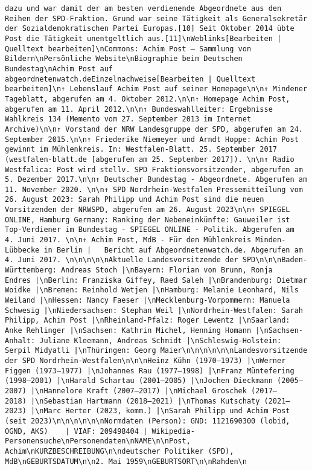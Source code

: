 \documentclass[
]{article}
\begin{document}
\begin{verbatim}
dazu und war damit der am besten verdienende Abgeordnete aus den Reihen der SPD-Fraktion. Grund war seine Tätigkeit als Generalsekretär der Sozialdemokratischen Partei Europas.[10] Seit Oktober 2014 übte Post die Tätigkeit unentgeltlich aus.[11]\nWeblinks[Bearbeiten | Quelltext bearbeiten]\nCommons: Achim Post – Sammlung von Bildern\nPersönliche Website\nBiographie beim Deutschen Bundestag\nAchim Post auf abgeordnetenwatch.deEinzelnachweise[Bearbeiten | Quelltext bearbeiten]\n↑ Lebenslauf Achim Post auf seiner Homepage\n\n↑ Mindener Tageblatt, abgerufen am 4. Oktober 2012.\n\n↑ Homepage Achim Post, abgerufen am 11. April 2012.\n\n↑ Bundeswahlleiter: Ergebnisse Wahlkreis 134 (Memento vom 27. September 2013 im Internet Archive)\n\n↑ Vorstand der NRW Landesgruppe der SPD, abgerufen am 24. September 2015.\n\n↑ Friederike Niemeyer und Arndt Hoppe: Achim Post gewinnt im Mühlenkreis. In: Westfalen-Blatt. 25. September 2017 (westfalen-blatt.de [abgerufen am 25. September 2017]). \n\n↑ Radio Westfalica: Post wird stellv. SPD Fraktionsvorsitzender, abgerufen am 5. Dezember 2017.\n\n↑ Deutscher Bundestag - Abgeordnete. Abgerufen am 11. November 2020. \n\n↑ SPD Nordrhein-Westfalen Pressemitteilung vom 26. August 2023: Sarah Philipp und Achim Post sind die neuen Vorsitzenden der NRWSPD, abgerufen am 26. August 2023\n\n↑ SPIEGEL ONLINE, Hamburg Germany: Ranking der Nebeneinkünfte: Gauweiler ist Top-Verdiener im Bundestag - SPIEGEL ONLINE - Politik. Abgerufen am 4. Juni 2017. \n\n↑ Achim Post, MdB - Für den Mühlenkreis Minden-Lübbecke in Berlin |   Bericht auf Abgeordnetenwatch.de. Abgerufen am 4. Juni 2017. \n\n\n\n\nAktuelle Landesvorsitzende der SPD\n\n\nBaden-Württemberg: Andreas Stoch |\nBayern: Florian von Brunn, Ronja Endres |\nBerlin: Franziska Giffey, Raed Saleh |\nBrandenburg: Dietmar Woidke |\nBremen: Reinhold Wetjen |\nHamburg: Melanie Leonhard, Nils Weiland |\nHessen: Nancy Faeser |\nMecklenburg-Vorpommern: Manuela Schwesig |\nNiedersachsen: Stephan Weil |\nNordrhein-Westfalen: Sarah Philipp, Achim Post |\nRheinland-Pfalz: Roger Lewentz |\nSaarland: Anke Rehlinger |\nSachsen: Kathrin Michel, Henning Homann |\nSachsen-Anhalt: Juliane Kleemann, Andreas Schmidt |\nSchleswig-Holstein: Serpil Midyatli |\nThüringen: Georg Maier\n\n\n\n\n\nLandesvorsitzende der SPD Nordrhein-Westfalen\n\n\nHeinz Kühn (1970–1973) |\nWerner Figgen (1973–1977) |\nJohannes Rau (1977–1998) |\nFranz Müntefering (1998–2001) |\nHarald Schartau (2001–2005) |\nJochen Dieckmann (2005–2007) |\nHannelore Kraft (2007–2017) |\nMichael Groschek (2017–2018) |\nSebastian Hartmann (2018–2021) |\nThomas Kutschaty (2021–2023) |\nMarc Herter (2023, komm.) |\nSarah Philipp und Achim Post (seit 2023)\n\n\n\n\n\nNormdaten (Person): GND: 1121690300 (lobid, OGND, AKS)    | VIAF: 209498404 | Wikipedia-Personensuche\nPersonendaten\nNAME\n\nPost, Achim\nKURZBESCHREIBUNG\n\ndeutscher Politiker (SPD), MdB\nGEBURTSDATUM\n\n2. Mai 1959\nGEBURTSORT\n\nRahden\n

\end{verbatim}
\end{document}
